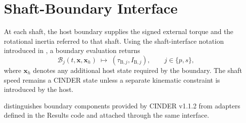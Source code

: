 \documentclass[11pt]{report}
\numberwithin{equation}{section}
\newcommand{\vect}[1]{\bm{#1}}
\begin{document}
\section{Shaft-Boundary Interface}
\label{app:results_boundary_models}

At each shaft, the host boundary supplies the signed external torque and the
rotational inertia referred to that shaft.  Using the shaft-interface notation introduced in ,
a boundary evaluation returns
\begin{equation}
\mathcal{B}_j(t,\vect{x},\vect{x}_h)
\;\longmapsto\;
\left(\tau_{\mathrm{B},j},I_{\mathrm{B},j}\right),
\qquad j\in\{p,s\},
\label{eq:shaft_boundary_interface}
\end{equation}
where \(\vect{x}_h\) denotes any additional host state required by the boundary.
The shaft speed remains a CINDER state unless a separate kinematic constraint is
introduced by the host.

 distinguishes boundary components
provided by CINDER v1.1.2 from adapters defined in the Results code and attached
through the same interface.
\end{document}
